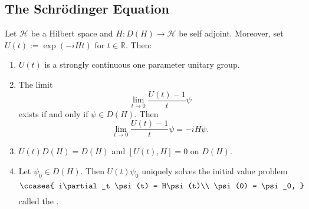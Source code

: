 \subsection*{The Schr\"odinger Equation}

\begin{theorem}
	Let $\mathcal{H}$ be a Hilbert space and $H : D(H) \to \mathcal{H}$ be self adjoint. Moreover, set $U(t) := \exp(-iHt)$ for $t \in \mathbb{R}$. Then:
	\begin{enumerate}[label=\textup{(}\alph*\textup{)},wide=0pt]
		\item $U(t)$ is a strongly continuous one parameter unitary group.
		\item The limit
			\begin{equation*}
				\lim_{t \to 0} \frac{U(t) - 1}{t}\psi
			\end{equation*}
			\noindent exists if and only if $\psi \in D(H)$. Then
			\begin{equation*}
				\lim_{t \to 0} \frac{U(t) - 1}{t}\psi = -iH\psi.
			\end{equation*}
		\item $U(t)D(H) = D(H)$ and $[U(t),H] = 0$ on $D(H)$.
		\item Let $\psi_0 \in D(H)$. Then $U(t)\psi_0$ uniquely solves the initial value problem
			\begin{equation}
				\ccases{
					i\partial_t \psi(t) = H\psi(t)\\
					\psi(0) = \psi_0,
				}
			\end{equation}
			\noindent called the .
	\end{enumerate}
\end{theorem}

